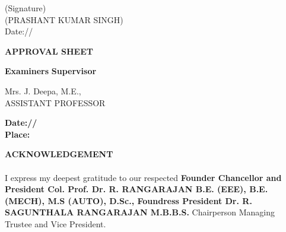 \documentclass[10pt]{report}
\begin{document}
\vspace{2.0cm}

\begin{flushright}
    (Signature)\\
    \large{(PRASHANT KUMAR SINGH)}\\
    \large{Date:\hspace*{1.0cm}/\hspace*{1.0cm}/}\\[2.0cm]
\end{flushright}

\newpage

\pagecolor{white}
\color{black}


\newpage
\begin{center}
\Huge\textbf{APPROVAL SHEET}\\
\vspace{1.0cm}
\end{center}
\linespread{1.5}
\vspace{4.0cm}
\begin{flushleft}
\Large \textbf{Examiners} \hfill \Large \textbf{Supervisor}\\
\end{flushleft}
\begin{flushright}
Mrs. J. Deepa, M.E.,\\
ASSISTANT PROFESSOR
\end{flushright}
\vspace{1.0cm}
\begin{flushleft}
\large{\textbf{Date:\hspace*{1.0cm}/\hspace*{2.0cm}/}}\\
\large{\textbf{Place:}}
\end{flushleft}
\newpage
\begin{center}
\LARGE{\textbf{ACKNOWLEDGEMENT}}\\[1cm]
\end{center}
\linespread{1.5}
\justifying
\large{\paragraph{}I express my deepest gratitude to our respected \textbf{Founder Chancellor and President Col. Prof. Dr. R. RANGARAJAN B.E. (EEE), B.E. (MECH), M.S (AUTO), D.Sc., Foundress President Dr. R. SAGUNTHALA RANGARAJAN M.B.B.S.} Chairperson Managing Trustee and Vice President.}
\end{document}
